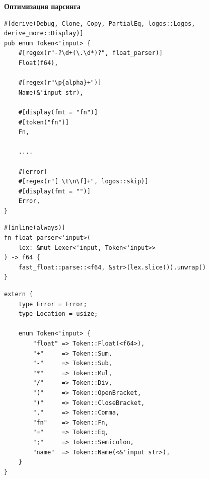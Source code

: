 \begin{frame}[fragile]
  \textbf{Оптимизация парсинга}
\end{frame}

\begin{frame}[fragile]
    \begin{verbatim}
#[derive(Debug, Clone, Copy, PartialEq, logos::Logos, derive_more::Display)]
pub enum Token<'input> {
    #[regex(r"-?\d+(\.\d*)?", float_parser)]
    Float(f64),

    #[regex(r"\p{alpha}+")]
    Name(&'input str),

    #[display(fmt = "fn")]
    #[token("fn")]
    Fn,

    ....

    #[error]
    #[regex(r"[ \t\n\f]+", logos::skip)]
    #[display(fmt = "")]
    Error,
}
    \end{verbatim}
\end{frame}

\begin{frame}[fragile]
    \begin{verbatim}
#[inline(always)]
fn float_parser<'input>(
    lex: &mut Lexer<'input, Token<'input>>
) -> f64 {
    fast_float::parse::<f64, &str>(lex.slice()).unwrap()
}
    \end{verbatim}
\end{frame}

\begin{frame}[fragile]
    \begin{verbatim}
extern {
    type Error = Error;
    type Location = usize;

    enum Token<'input> {
        "float" => Token::Float(<f64>),
        "+"     => Token::Sum,
        "-"     => Token::Sub,
        "*"     => Token::Mul,
        "/"     => Token::Div,
        "("     => Token::OpenBracket,
        ")"     => Token::CloseBracket,
        ","     => Token::Comma,
        "fn"    => Token::Fn,
        "="     => Token::Eq,
        ";"     => Token::Semicolon,
        "name"  => Token::Name(<&'input str>),
    }
}
    \end{verbatim}
\end{frame}

